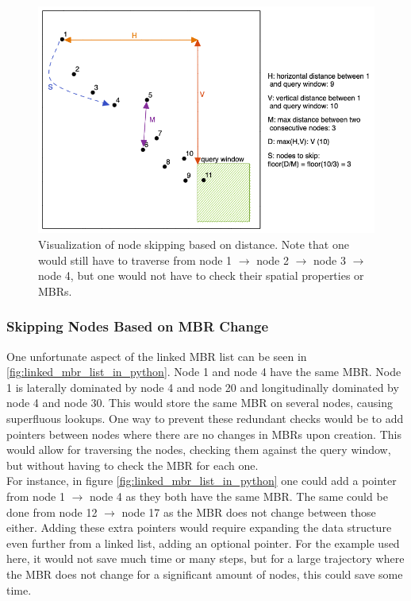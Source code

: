 \begin{figure}
	\centering
	\includegraphics[width=\textwidth]{figures/node_skipping.excalidraw.png}
	\caption{Visualization of node skipping based on distance. Note that one would still have to traverse from node 1 $\rightarrow$ node 2 $\rightarrow$ node 3 $\rightarrow$ node 4, but one would not have to check their spatial properties or MBRs.}
	\label{fig:node_skipping}
\end{figure}

\subsubsection{Skipping Nodes Based on MBR Change}
One unfortunate aspect of the linked MBR list can be seen in \ref{fig:linked_mbr_list_in_python}. Node 1 and node 4 have the same MBR. Node 1 is laterally dominated by node 4 and node 20 and longitudinally dominated by node 4 and node 30. This would store the same MBR on several nodes, causing superfluous lookups. One way to prevent these redundant checks would be to add pointers between nodes where there are no changes in MBRs upon creation. This would allow for traversing the nodes, checking them against the query window, but without having to check the MBR for each one. \\

For instance, in figure \ref{fig:linked_mbr_list_in_python} one could add a pointer from node 1 $\rightarrow$ node 4 as they both have the same MBR. The same could be done from node 12 $\rightarrow$ node 17 as the MBR does not change between those either. Adding these extra pointers would require expanding the data structure even further from a linked list, adding an optional pointer. For the example used here, it would not save much time or many steps, but for a large trajectory where the MBR does not change for a significant amount of nodes, this could save some time.

